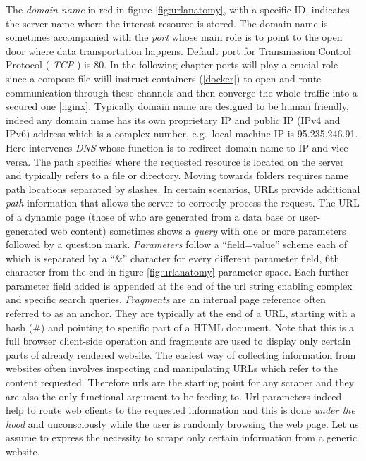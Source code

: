 \documentclass[
  12pt,
  a4paper,
  oneside]{book}
\theoremstyle{definition}
\theoremstyle{definition}
\theoremstyle{definition}
\theoremstyle{remark}
\begin{document}
The \emph{domain name} in red in figure \ref{fig:urlanatomy}, with a specific ID, indicates the server name where the interest resource is stored. The domain name is sometimes accompanied with the \emph{port} whose main role is to point to the open door where data transportation happens. Default port for Transmission Control Protocol ( \emph{TCP} ) is 80. In the following chapter ports will play a crucial role since a compose file wiill instruct containers (\ref{docker}) to open and route communication through these channels and then converge the whole traffic into a secured one \ref{nginx}.
Typically domain name are designed to be human friendly, indeed any domain name has its own proprietary IP and public IP (IPv4 and IPv6) address which is a complex number, e.g.~local machine IP is 95.235.246.91. Here intervenes \emph{DNS} whose function is to redirect domain name to IP and vice versa. The path specifies where the requested resource is located on the server and typically refers to a file or directory. Moving towards folders requires name path locations separated by slashes. In certain scenarios, URLs provide additional \emph{path} information that allows the server to correctly process the request. The URL of a dynamic page (those of who are generated from a data base or user-generated web content) sometimes shows a \emph{query} with one or more parameters followed by a question mark. \emph{Parameters} follow a ``field=value'' scheme each of which is separated by a ``\&'' character for every different parameter field, 6th character from the end in figure \ref{fig:urlanatomy} parameter space. Each further parameter field added is appended at the end of the url string enabling complex and specific search queries.
\emph{Fragments} are an internal page reference often referred to as an anchor. They are typically at the end of a URL, starting with a hash (\#) and pointing to specific part of a HTML document. Note that this is a full browser client-side operation and fragments are used to display only certain parts of already rendered website.
The easiest way of collecting information from websites often involves inspecting and manipulating URLs which refer to the content requested. Therefore urls are the starting point for any scraper and they are also the only functional argument to be feeding to. Url parameters indeed help to route web clients to the requested information and this is done \emph{under the hood} and unconsciously while the user is randomly browsing the web page.
Let us assume to express the necessity to scrape only certain information from a generic website.
\end{document}
